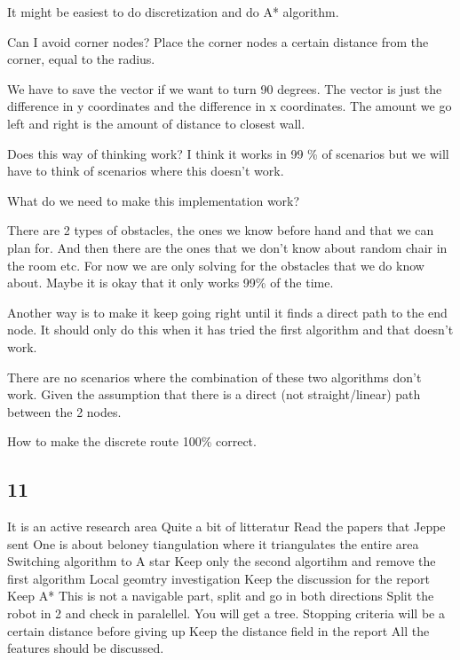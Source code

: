 It might be easiest to do discretization and do A* algorithm.


Can I avoid corner nodes?
Place the corner nodes a certain distance from the corner, equal to the radius.

We have to save the vector if we want to turn 90 degrees.
The vector is just the difference in y coordinates and the difference in x coordinates.
The amount we go left and right is the amount of distance to closest wall.

Does this way of thinking work?
I think it works in 99 \% of scenarios but we will have to think of scenarios where this doesn't work.

What do we need to make this implementation work?

There are 2 types of obstacles, the ones we know before hand and that we can plan for.
And then there are the ones that we don't know about random chair in the room etc.
For now we are only solving for the obstacles that we do know about.
Maybe it is okay that it only works 99\% of the time.

Another way is to make it keep going right until it finds a direct path to the end node.
It should only do this when it has tried the first algorithm and that doesn't work.

There are no scenarios where the combination of these two algorithms don't work.
Given the assumption that there is a direct (not straight/linear) path between the 2 nodes.

How to make the discrete route 100\% correct.

\subsection{11}
It is an active research area
Quite a bit of litteratur 
Read  the papers that Jeppe sent
One is about beloney tiangulation where it triangulates the entire area
Switching algorithm to A star
Keep only the second algortihm and remove the first algorithm
Local geomtry investigation
Keep the discussion for the report
Keep A*
This is not a navigable part, split and go in both directions
Split the robot in 2 and check in paralellel. You will get a tree.
Stopping criteria  will be a certain distance before giving up
Keep the distance field in the report
All the features should be discussed. 

